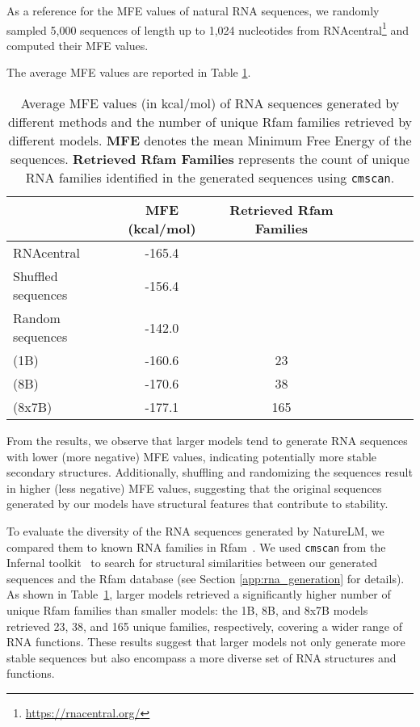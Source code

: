 As a reference for the MFE values of natural RNA sequences, we randomly sampled 5,000 sequences of length up to 1,024 nucleotides from RNAcentral\footnote{\url{https://rnacentral.org/}} and computed their MFE values.

The average MFE values are reported in Table \ref{tab:unconditional_rna_generation_mfe}.

\begin{table}[!htpb]
\centering
\begin{tabular}{lccccccc}
\toprule
               & MFE (kcal/mol) & Retrieved Rfam Families \\
\midrule
RNAcentral     & -165.4 \\
Shuffled sequences & -156.4 \\
Random sequences &  -142.0 \\
\ourM{} (1B)   & -160.6 & 23 \\
\ourM{} (8B)   & -170.6 & 38 \\
\ourM{} (8x7B) & -177.1 & 165 \\
\bottomrule
\end{tabular}
\caption{Average MFE values (in kcal/mol) of RNA sequences generated by different methods and the number of unique Rfam families retrieved by different models. \textbf{MFE} denotes the mean Minimum Free Energy of the sequences. \textbf{Retrieved Rfam Families} represents the count of unique RNA families identified in the generated sequences using \texttt{cmscan}. }
\label{tab:unconditional_rna_generation_mfe}
\end{table}

From the results, we observe that larger models tend to generate RNA sequences with lower (more negative) MFE values, indicating potentially more stable secondary structures. Additionally, shuffling and randomizing the sequences result in higher (less negative) MFE values, suggesting that the original sequences generated by our models have structural features that contribute to stability.

To evaluate the diversity of the RNA sequences generated by NatureLM, we compared them to known RNA families in Rfam~\cite{10.1093/nar/gkaa1047}. We used \texttt{cmscan} from the Infernal toolkit~\cite{10.1093/bioinformatics/btt509} to search for structural similarities between our generated sequences and the Rfam database (see Section \ref{app:rna_generation} for details). As shown in Table~\ref{tab:unconditional_rna_generation_mfe}, larger models retrieved a significantly higher number of unique Rfam families than smaller models: the 1B, 8B, and 8x7B models retrieved 23, 38, and 165 unique families, respectively, covering a wider range of RNA functions. These results suggest that larger models not only generate more stable sequences but also encompass a more diverse set of RNA structures and functions.

